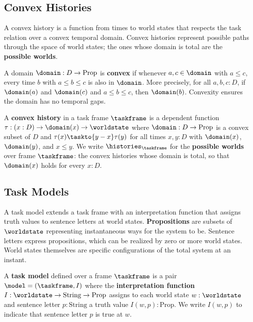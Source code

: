 \documentclass[../BimodalReference.tex]{subfiles}
\begin{document}
\subsection{Convex Histories}

A convex history is a function from times to world states that respects the task relation over a convex temporal domain.
Convex histories represent possible paths through the space of world states; the ones whose domain is total are the \textbf{possible worlds}.

\begin{definition}
A domain $\domain : D \to \text{Prop}$ is \textbf{convex} if whenever $a, c \in \domain$ with $a \le c$, every time $b$ with $a \le b \le c$ is also in $\domain$.
More precisely, for all $a, b, c : D$, if $\domain(a)$ and $\domain(c)$ and $a \le b \le c$, then $\domain(b)$.
Convexity ensures the domain has no temporal gaps.
\end{definition}

\begin{definition}
A \textbf{convex history} in a task frame $\taskframe$ is a dependent function $\tau : (x : D) \to \domain(x) \to \worldstate$ where $\domain : D \to \text{Prop}$ is a convex subset of $D$ and $\tau(x) \taskto{y-x} \tau(y)$ for all times $x, y : D$ with $\domain(x)$, $\domain(y)$, and $x \le y$.
We write $\histories_{\taskframe}$ for the \textbf{possible worlds} over frame $\taskframe$: the convex histories whose domain is total, so that $\domain(x)$ holds for every $x : D$.
\end{definition}

\subsection{Task Models}

A task model extends a task frame with an interpretation function that assigns truth values to sentence letters at world states.
\textbf{Propositions} are subsets of $\worldstate$ representing instantaneous ways for the system to be.
Sentence letters express propositions, which can be realized by zero or more world states.
World states themselves are specific configurations of the total system at an instant.

\begin{definition}
A \textbf{task model} defined over a frame $\taskframe$ is a pair $\model = (\taskframe, I)$ where the \textbf{interpretation function} $I : \worldstate \to \text{String} \to \text{Prop}$ assigns to each world state $w : \worldstate$ and sentence letter $p : \text{String}$ a truth value $I(w, p) : \text{Prop}$.
We write $I(w, p)$ to indicate that sentence letter $p$ is true at $w$.
\end{definition}
\end{document}
